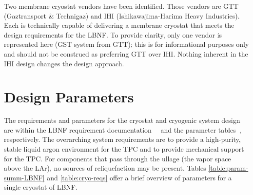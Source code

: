 Two membrane cryostat vendors have been 
identified. Those vendors are GTT (Gaztransport \& Technigaz) and 
IHI (Ishikawajima-Harima Heavy Industries). Each is technically capable 
of delivering a membrane cryostat that meets the design requirements for 
the LBNF. To provide clarity, only one vendor is represented here (GST 
system from GTT); this is for informational purposes only and should not 
be construed as preferring GTT over IHI. Nothing inherent in the IHI 
design changes the design approach. 


\section{Design Parameters}
\label{sec:cryo-cryosys-params}

The requirements and parameters for the cryostat and cryogenic system 
design are within the LBNF requirement documentation~\cite{lar-fd-req}~\cite{lar-fd-req-traceback}  
and the parameter tables~\cite{lar-fd-params}, respectively. The 
overarching system requirements are to provide a high-purity, 
stable liquid argon environment for the TPC and to provide 
mechanical support for the TPC. For components that pass 
through the ullage (the vapor space above the LAr), no 
sources of reliquefaction may be present. Tables 
\ref{table:param-summ-LBNF} and \ref{table:cryo-reqs} 
offer a brief overview of parameters for a single 
cryostat of LBNF.

